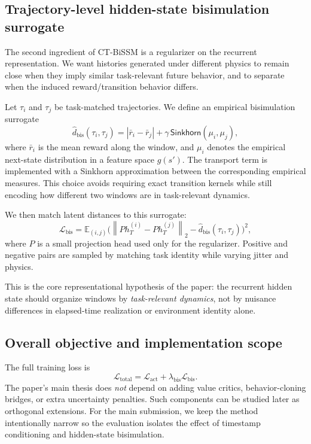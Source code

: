 \documentclass[11pt]{article}
\newcommand{\E}{\mathbb{E}}
\newcommand{\cL}{\mathcal{L}}
\newcommand{\norm}[1]{\left\lVert #1 \right\rVert}
\newcommand{\abs}[1]{\left\lvert #1 \right\rvert}
\newcommand{\traj}{\tau}
\newcommand{\Sink}{\mathsf{Sinkhorn}}
\begin{document}
\subsection{Trajectory-level hidden-state bisimulation surrogate}

The second ingredient of CT-BiSSM is a regularizer on the recurrent representation. We want histories generated under different physics to remain close when they imply similar task-relevant future behavior, and to separate when the induced reward/transition behavior differs.

Let $\traj_i$ and $\traj_j$ be task-matched trajectories. We define an empirical bisimulation surrogate
\begin{equation}
\widehat{d}_{\mathrm{bis}}(\traj_i,\traj_j)
= \abs{\bar r_i - \bar r_j} + \gamma \, \Sink(\mu_i,\mu_j),
\label{eq:emp_bisim}
\end{equation}
where $\bar r_i$ is the mean reward along the window, and $\mu_i$ denotes the empirical next-state distribution in a feature space $g(s')$. The transport term is implemented with a Sinkhorn approximation between the corresponding empirical measures. This choice avoids requiring exact transition kernels while still encoding how different two windows are in task-relevant dynamics.

We then match latent distances to this surrogate:
\begin{equation}
\cL_{\mathrm{bis}}
= \E_{(i,j)} \Big( \norm{P h_T^{(i)} - P h_T^{(j)}}_2 - \widehat{d}_{\mathrm{bis}}(\traj_i,\traj_j) \Big)^2,
\label{eq:bisloss}
\end{equation}
where $P$ is a small projection head used only for the regularizer. Positive and negative pairs are sampled by matching task identity while varying jitter and physics.

This is the core representational hypothesis of the paper: the recurrent hidden state should organize windows by \emph{task-relevant dynamics}, not by nuisance differences in elapsed-time realization or environment identity alone.

\subsection{Overall objective and implementation scope}

The full training loss is
\begin{equation}
\cL_{\mathrm{total}} = \cL_{\mathrm{act}} + \lambda_{\mathrm{bis}} \cL_{\mathrm{bis}}.
\label{eq:totalloss}
\end{equation}
The paper's main thesis does \emph{not} depend on adding value critics, behavior-cloning bridges, or extra uncertainty penalties. Such components can be studied later as orthogonal extensions. For the main submission, we keep the method intentionally narrow so the evaluation isolates the effect of timestamp conditioning and hidden-state bisimulation.
\end{document}
